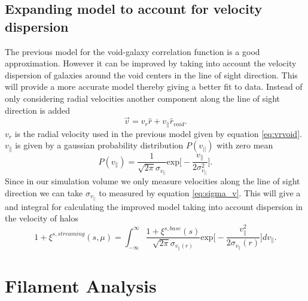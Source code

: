 \subsection{Expanding model to account for velocity dispersion}
The previous model for the void-galaxy correlation function is a good
approximation. However it can be improved by taking into account the velocity
dispersion of galaxies around the void centers in the line of sight direction.
This will provide a more accurate model thereby giving a better fit to data.
Instead of only considering radial velocities another component along the line
of sight direction is added
\begin{equation}
    \vec{v}=v_r\hat{r}+v_\parallel \hat{r}_{void}.
\end{equation}
$v_r$ is the radial velocity used in the previous model given by equation
\ref{eq:vrvoid}. $v_\parallel$ is given by a gaussian probability distribution
$P(v_{\vert\vert})$ with zero mean
\begin{equation}
    P(v_\parallel)=\frac{1}{\sqrt{2\pi}\sigma_{v_{\parallel}}}\mathrm{exp}\Big[-\frac{v_\parallel}{2\sigma_{v_\parallel}^2}\Big].
\end{equation}
Since in our simulation volume we only measure velocities along the line of
sight direction we can take $\sigma_{v_{\parallel}}$ to measured by equation
\ref{eq:sigma_v}. This will give a and integral for calculating the improved
model taking into account dispersion in the velocity of halos \cite{BeyondBAO}
\begin{equation}\label{eq:corr_stream}
    1+\xi^{s,streaming}(s,\mu)=\int_{-\infty}^\infty\frac{1+\xi^{s,base}(s)}{\sqrt{2\pi}\sigma_{v_{\parallel}(r)}}\mathrm{exp}\Big[-\frac{v_\parallel^2}{2\sigma_{v_\parallel}(r)}\Big]dv_\parallel.
\end{equation}
\section{Filament Analysis}
